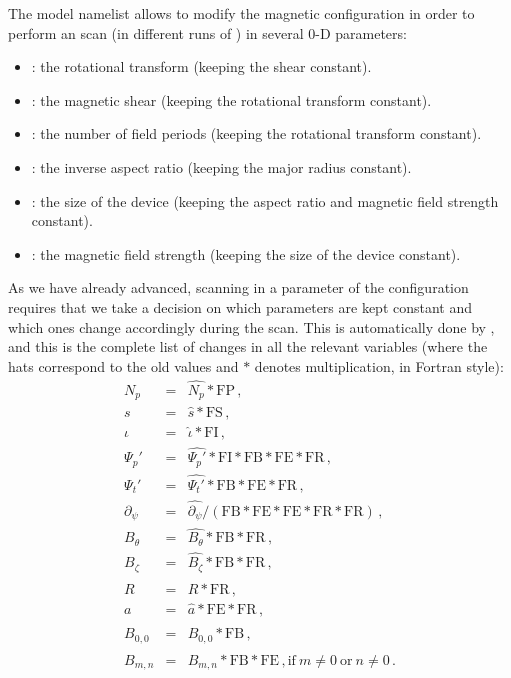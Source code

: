 The {\ttfamily model} namelist allows to modify the magnetic configuration in order to perform an scan (in different runs of \KNOSOS) in several 0-D parameters:
\begin{itemize}
\item {}:  the rotational transform (keeping the shear constant).
\item {}: the magnetic shear (keeping the rotational transform constant).
\item {}: the number of field periods  (keeping the rotational transform constant).
\item {}: the inverse aspect ratio (keeping the major radius constant).
\item {}: the size of the device (keeping the aspect ratio and magnetic field strength constant).
\item {}: the magnetic field strength (keeping the size of the device constant).
\end{itemize}
As we have already advanced, scanning in a parameter of the configuration requires that we take a decision on which parameters are kept constant and which ones change accordingly during the scan. This is automatically done by \KNOSOS, and this is the complete list of changes in all the relevant variables (where the hats correspond to the old values and $*$ denotes multiplication, in Fortran style):
\begin{eqnarray}
  N_p&=& \hat{N_p} *\mathrm{FP}\,,\nonumber\\
   s  &=& \hat{s}  *\mathrm{FS}\,,\nonumber\\
  \iota  &=& \hat{\iota}  *\mathrm{FI}\,,\nonumber\\
  \Psi_p'    &=& \hat{\Psi_p'}*\mathrm{FI*FB*FE*FR}\,,\nonumber\\
  \Psi_t'    &=& \hat{\Psi_t' }*\mathrm{FB*FE *FR}\,,\nonumber\\
  \partial_\psi    &=& \hat{\partial_\psi} / \mathrm{(FB*FE*FE*FR*FR)}\,,\nonumber\\
    B_\theta  &=& \hat{B_\theta}*\mathrm{FB*FR}\,,\nonumber\\
  B_\zeta   &=& \hat{B_\zeta}*\mathrm{FB*FR}\,,\nonumber\\
  R   &=& \hat{R}*\mathrm{FR}\,,\nonumber\\
  a   &=& \hat{a}*\mathrm{FE*FR}\,,\nonumber\\
  B_{0,0} &=& \hat{B}_{0,0}*\mathrm{FB}\,,\nonumber\\
  B_{m,n} &=& \hat{B}_{m,n} *\mathrm{FB*FE}\,,\mathrm{if}~m\neq 0~\mathrm{or}~n\neq 0\,.
\end{eqnarray}



